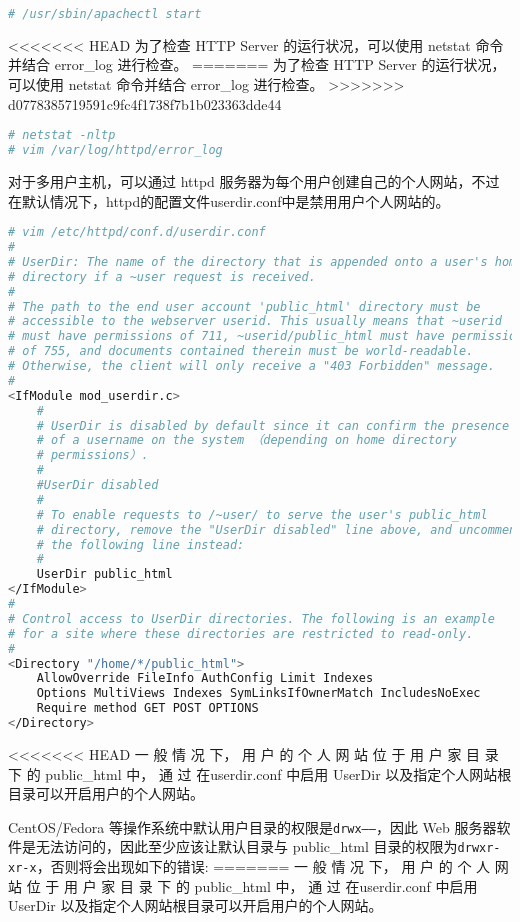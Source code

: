 \begin{lstlisting}[language=bash]
# /usr/sbin/apachectl start
\end{lstlisting}

<<<<<<< HEAD
为了检查 HTTP Server 的运行状况，可以使用 netstat 命令并结合 error_log 进行检查。
=======
为了检查 HTTP Server 的运行状况，可以使用 netstat 命令并结合 error\_log 进行检查。
>>>>>>> d0778385719591c9fc4f1738f7b1b023363dde44


\begin{lstlisting}[language=bash]
# netstat -nltp
# vim /var/log/httpd/error_log
\end{lstlisting}

对于多用户主机，可以通过 httpd 服务器为每个用户创建自己的个人网站，不过在默认情况下，httpd的配置文件userdir.conf中是禁用用户个人网站的。


\begin{lstlisting}[language=bash]
# vim /etc/httpd/conf.d/userdir.conf
#
# UserDir: The name of the directory that is appended onto a user's home
# directory if a ~user request is received.
#
# The path to the end user account 'public_html' directory must be
# accessible to the webserver userid. This usually means that ~userid
# must have permissions of 711, ~userid/public_html must have permissions
# of 755, and documents contained therein must be world-readable.
# Otherwise, the client will only receive a "403 Forbidden" message.
#
<IfModule mod_userdir.c>
	#
	# UserDir is disabled by default since it can confirm the presence
	# of a username on the system （depending on home directory
	# permissions）.
	#
	#UserDir disabled
	#
	# To enable requests to /~user/ to serve the user's public_html
	# directory, remove the "UserDir disabled" line above, and uncomment
	# the following line instead:
	#
	UserDir public_html
</IfModule>
#
# Control access to UserDir directories. The following is an example
# for a site where these directories are restricted to read-only.
#
<Directory "/home/*/public_html">
	AllowOverride FileInfo AuthConfig Limit Indexes
	Options MultiViews Indexes SymLinksIfOwnerMatch IncludesNoExec
	Require method GET POST OPTIONS
</Directory>
\end{lstlisting}


<<<<<<< HEAD
一 般 情 况 下， 用 户 的 个 人 网 站 位 于 用 户 家 目 录 下 的 public_html 中， 通 过 在userdir.conf 中启用 UserDir 以及指定个人网站根目录可以开启用户的个人网站。

CentOS/Fedora 等操作系统中默认用户目录的权限是\texttt{drwx------}，因此 Web 服务器软件是无法访问的，因此至少应该让默认目录与 public_html 目录的权限为\texttt{drwxr-xr-x}，否则将会出现如下的错误:
=======
一 般 情 况 下， 用 户 的 个 人 网 站 位 于 用 户 家 目 录 下 的 public\_html 中， 通 过 在userdir.conf 中启用 UserDir 以及指定个人网站根目录可以开启用户的个人网站。

